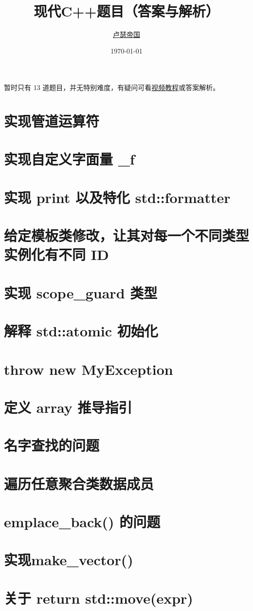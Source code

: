 \documentclass[11pt,fancyhdr]{ctexart}
\title{现代C++题目（答案与解析）}
\author{\href{https://github.com/Mq-b/Loser-HomeWork}{卢瑟帝国}\\}
\date{\today}
\begin{document}
\maketitle

\tableofcontents
\newpage

暂时只有 13 道题目，并无特别难度，有疑问可看\href{https://www.bilibili.com/video/BV1Zj411r7eP/}{视频教程}或答案解析。


\section{实现管道运算符}


\section{实现自定义字面量 \_f}

\section{实现 print 以及特化 std::formatter}

\section{给定模板类修改，让其对每一个不同类型实例化有不同 ID}

\section{实现 scope\_guard 类型}

\section{解释 std::atomic 初始化}

\section{throw new MyException}

\section{定义 array 推导指引}

\section{名字查找的问题}

\section{遍历任意聚合类数据成员}

\section{emplace\_back() 的问题}

\section{实现make\_vector()}

\section{关于 return std::move(expr)}
\end{document}
